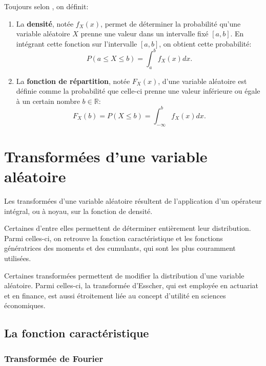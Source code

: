 Toujours selon \cite{dodge2004statistique}, on définit:
\begin{enumerate}
\item La \textbf{densité}, notée $f_X(x)$, permet de déterminer la
  probabilité qu'une variable aléatoire $X$ prenne une valeur dans un
  intervalle fixé $\left[ a,b \right]$. En intégrant cette fonction
  sur l'intervalle $\left[ a,b \right]$, on obtient cette probabilité:
  \begin{equation}
    \label{eq:densitedefinition}
    P(a \leq X \leq b) = \int_{a}^{b} f_X(x) dx.
  \end{equation}
\item La \textbf{fonction de répartition}, notée $F_X(x)$, d’une
  variable aléatoire est définie comme la probabilité que celle-ci
  prenne une valeur inférieure ou égale à un certain nombre $b \in
  \mathbb{R}$:
  \begin{equation}
    \label{eq:repartitiondefinition}
    F_X(b) = P(X \leq b) = \int_{-\infty}^{b} f_X(x) dx.
  \end{equation}
\end{enumerate}


\section{Transformées d'une variable aléatoire}
\label{sec:transformees}

Les transformées d'une variable aléatoire résultent de l'application
d'un opérateur intégral, ou à noyau, sur la fonction de densité.

Certaines d'entre elles permettent de déterminer entièrement leur
distribution. Parmi celles-ci, on retrouve la fonction caractéristique
et les fonctions génératrices des moments et des cumulants, qui sont
les plus couramment utilisées.

Certaines transformées permettent de modifier la distribution d'une
variable aléatoire. Parmi celles-ci, la transformée d'Esscher, qui est
employée en actuariat et en finance, est aussi étroitement liée au
concept d'utilité en sciences économiques.

\subsection{La fonction caractéristique}
\label{sec:fonctioncaract}

\subsubsection{Transformée de Fourier}
\label{sec:transfourier}

